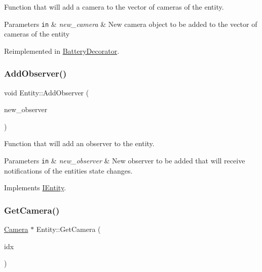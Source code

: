Function that will add a camera to the vector of cameras of the entity. 


\begin{DoxyParams}[1]{Parameters}
\mbox{\tt in}  & {\em new\+\_\+camera} & New camera object to be added to the vector of cameras of the entity \\
\hline
\end{DoxyParams}


Reimplemented in \hyperlink{classBatteryDecorator_a25470bba4af4e6c112a858584a38fcdd}{Battery\+Decorator}.

\mbox{\label{classEntity_a13e0fdabb9f5ae73ecd4d7bf7834a3a9}} 
\subsubsection{\texorpdfstring{Add\+Observer()}{AddObserver()}}
{\footnotesize\ttfamily void Entity\+::\+Add\+Observer (\begin{DoxyParamCaption}\item[{\hyperlink{classIObserver}{I\+Observer} $\ast$}]{new\+\_\+observer }\end{DoxyParamCaption})\hspace{0.3cm}{\ttfamily [virtual]}}



Function that will add an observer to the entity. 


\begin{DoxyParams}[1]{Parameters}
\mbox{\tt in}  & {\em new\+\_\+observer} & New observer to be added that will receive notifications of the entities state changes. \\
\hline
\end{DoxyParams}


Implements \hyperlink{classIEntity_a0d682e3663a78b6b5fd3df8cd51aa321}{I\+Entity}.

\mbox{\label{classEntity_ae09d3e79d0d14c2990b1da52d2268399}} 
\subsubsection{\texorpdfstring{Get\+Camera()}{GetCamera()}}
{\footnotesize\ttfamily \hyperlink{classCamera}{Camera} $\ast$ Entity\+::\+Get\+Camera (\begin{DoxyParamCaption}\item[{int}]{idx }\end{DoxyParamCaption})\hspace{0.3cm}{\ttfamily [virtual]}}



